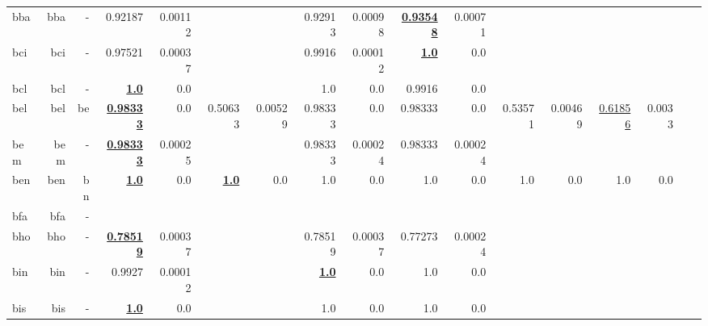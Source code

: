\documentclass[11pt]{article}
\begin{document}
\begin{table*}[h]
{\begin{tabular}{lrrrrrrrrrrrrrrrr}
bba         & bba         & -         & 0.92187         & 0.00112         &          &          & 0.92913         & 0.00098         & \textbf{\underline{0.93548}}         & 0.00071         &          &          &          &          \\
bci         & bci         & -         & 0.97521         & 0.00037         &          &          & 0.9916         & 0.00012         & \textbf{\underline{1.0}}         & 0.0         &          &          &          &          \\
bcl         & bcl         & -         & \textbf{\underline{1.0}}         & 0.0         &          &          & 1.0         & 0.0         & 0.9916         & 0.0         &          &          &          &          \\
bel         & bel         & be         & \textbf{\underline{0.98333}}         & 0.0         & 0.50633         & 0.00529         & 0.98333         & 0.0         & 0.98333         & 0.0         & 0.53571         & 0.00469         & \underline{0.61856}         & 0.0033         \\
bem         & bem         & -         & \textbf{\underline{0.98333}}         & 0.00025         &          &          & 0.98333         & 0.00024         & 0.98333         & 0.00024         &          &          &          &          \\
ben         & ben         & bn         & \textbf{\underline{1.0}}         & 0.0         & \textbf{\underline{1.0}}         & 0.0         & 1.0         & 0.0         & 1.0         & 0.0         & 1.0         & 0.0         & 1.0         & 0.0         \\
bfa         & bfa         & -         &          &          &          &          &          &          &          &          &          &          &          &          \\
bho         & bho         & -         & \textbf{\underline{0.78519}}         & 0.00037         &          &          & 0.78519         & 0.00037         & 0.77273         & 0.00024         &          &          &          &          \\
bin         & bin         & -         & 0.9927         & 0.00012         &          &          & \textbf{\underline{1.0}}         & 0.0         & 1.0         & 0.0         &          &          &          &          \\
bis         & bis         & -         & \textbf{\underline{1.0}}         & 0.0         &          &          & 1.0         & 0.0         & 1.0         & 0.0         &          &          &          &          \\

\end{tabular}}
\end{table*}
\end{document}
